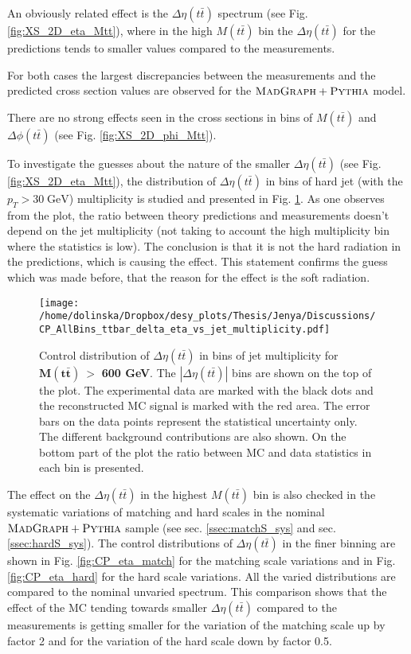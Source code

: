 An obviously related effect is the $\Delta\eta(t\bar{t})$ spectrum (see Fig. \ref{fig:XS_2D_eta_Mtt}),
where in the high $M(t\bar{t})$ bin the $\Delta\eta(t\bar{t})$ for the predictions tends to smaller values compared to the measurements.

For both cases the largest discrepancies between the measurements and the predicted cross section values are observed for the $\textsc{MadGraph}+\textsc{Pythia}$
model.

There are no strong effects seen in the cross sections in bins of $M(t\bar{t})$ and $\Delta\phi(t\bar{t})$ (see Fig. \ref{fig:XS_2D_phi_Mtt}).

To investigate the guesses about the nature of the smaller $\Delta\eta(t\bar{t})$ (see Fig. \ref{fig:XS_2D_eta_Mtt}),
the distribution of $\Delta\eta(t\bar{t})$ in bins of hard jet (with the $p_{T} > 30\;\text{GeV}$) multiplicity is studied and presented
in Fig. \ref{fig:eta_jetMult}. As one observes from the plot, the ratio between theory predictions and measurements doesn't depend
on the jet multiplicity (not taking to account the high multiplicity bin where the statistics is low). The conclusion is that it
is not the hard radiation in the predictions, which is causing the effect. This statement confirms the guess which was made before, that
the reason for the effect is the soft radiation.

\begin{figure}[t]
  \centering
  \texttt{[image: /home/dolinska/Dropbox/desy\_plots/Thesis/Jenya/Discussions/CP\_AllBins\_ttbar\_delta\_eta\_vs\_jet\_multiplicity.pdf]}
  \caption{Control distribution of $\Delta\eta({t\bar{t}})$ in bins of jet multiplicity for $\mathbf{M(t\bar{t})\: >}$ \textbf{600 GeV}. The $|\Delta\eta(t\bar{t})|$ 
  bins are shown on the top of the plot. The experimental data are marked with the black dots and the reconstructed MC signal is marked with the red area. The error
  bars on the data points represent the statistical uncertainty only. The 
  different background contributions are also shown. On the bottom part of the plot the ratio between MC and data statistics in each bin
  is presented.}
  \label{fig:eta_jetMult}
\end{figure}

The effect on the $\Delta\eta(t\bar{t})$ in the highest $M(t\bar{t})$ bin is also checked in the systematic variations of matching and hard scales in the nominal $\textsc{MadGraph}+\textsc{Pythia}$ sample 
(see sec. \ref{ssec:matchS_sys} and sec. \ref{ssec:hardS_sys}). The control distributions of $\Delta\eta(t\bar{t})$ in the finer binning are shown 
in Fig. \ref{fig:CP_eta_match} for the matching scale variations and in Fig. \ref{fig:CP_eta_hard} for the hard scale variations. All the varied 
distributions are compared to the nominal unvaried spectrum. This comparison shows that the effect of the MC tending towards smaller $\Delta\eta(t\bar{t})$
compared to the measurements is getting smaller for the variation of the matching scale up by factor 2 and for the variation of the hard scale down 
by factor 0.5.

